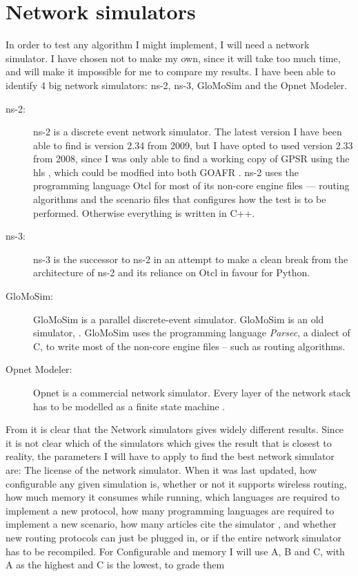 \section{Network simulators}
\label{section:network_simulators}

In order to test any algorithm I might implement, I will need a network simulator. I have chosen not to make my own, since it will take too much time, and will make it impossible for me to compare my results. I have been able to identify 4 big network simulators: ns-2, ns-3, GloMoSim and the Opnet Modeler.

\begin{description}
\item[ns-2:] ns-2 is a discrete event network simulator. The latest version I have been able to find is version 2.34 from 2009, but I have opted to used version 2.33 from 2008, since I was only able to find a working copy of GPSR  using the \ac{hls} , which could be modfied into both GOAFR . ns-2 uses the programming language Otcl for most of its non-core engine files ---  routing algorithms and the scenario files that configures how the test is to be performed. Otherwise everything is written in C++.
\item[ns-3:] ns-3 is the successor to ns-2 in an attempt to make a clean break from the architecture of ns-2 and its reliance on Otcl in favour for Python.
\item[GloMoSim:] GloMoSim is a parallel discrete-event simulator. GloMoSim is an old simulator, . GloMoSim uses the programming language \emph{Parsec}, a dialect of C, to write most of the non-core engine files -- such as routing algorithms. 
\item[Opnet Modeler:] Opnet is a commercial network simulator. Every layer of the network stack has to be modelled as a finite state machine \cite{MANcom}. 
\end{description}

From \cite{MANcom} it is clear that the Network simulators gives widely different results. Since it is not clear which of the simulators which gives the result that is closest to reality, the parameters I will have to apply to find the best network simulator are: The license of the network simulator. When it was last updated, how configurable any given simulation is, whether or not it supports wireless routing, how much memory it consumes while running, which languages are required to implement a new protocol, how many programming languages are required to implement a new scenario, how many articles cite the simulator , and whether new routing protocols can just be plugged in, or if the entire network simulator has to be recompiled. For Configurable and memory I will use A, B and C, with A as the highest and C is the lowest, to grade them


